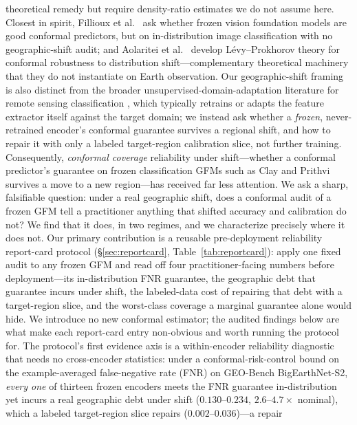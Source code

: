 \documentclass[journal]{IEEEtran}
\renewcommand{\_}{\textunderscore\allowbreak}
\begin{document}
theoretical remedy but require density-ratio estimates we do not assume here.
Closest in spirit, Fillioux et al.~\citep{fillioux2024fmconformal} ask whether frozen vision foundation models are good
conformal predictors, but on in-distribution image classification with no geographic-shift audit; and
Aolaritei et al.~\citep{aolaritei2025levyprokhorov} develop L\'evy--Prokhorov theory for conformal robustness to distribution
shift---complementary theoretical machinery that they do not instantiate on Earth observation.
Our geographic-shift framing is also distinct from the broader unsupervised-domain-adaptation literature for
remote sensing classification \citep{tuia2016domain,zhu2017deep}, which typically retrains or adapts the
feature extractor itself against the target domain; we instead ask whether a \emph{frozen}, never-retrained
encoder's conformal guarantee survives a regional shift, and how to repair it with only a labeled
target-region calibration slice, not further training.
Consequently, \emph{conformal coverage} reliability
under shift---whether a conformal predictor's guarantee \citep{vovk2005algorithmic,angelopoulos2023conformal} on frozen classification GFMs
such as Clay and Prithvi survives a move to a new
region---has received far less attention. We ask a sharp, falsifiable question: under a real geographic
shift, does a conformal audit of a frozen GFM tell a practitioner anything that shifted accuracy
and calibration do not? We find that it does, in two regimes, and we characterize precisely where it
does not. Our primary contribution is a reusable pre-deployment reliability report-card protocol
(\S\ref{sec:reportcard}, Table~\ref{tab:reportcard}): apply one fixed audit to any frozen GFM and read
off four practitioner-facing numbers before deployment---its in-distribution FNR guarantee, the
geographic debt that guarantee incurs under shift, the labeled-data cost of repairing that debt with a
target-region slice, and the worst-class coverage a marginal guarantee alone would hide. We introduce no
new conformal estimator; the audited findings below are what make each report-card entry non-obvious and
worth running the protocol for. The protocol's first evidence axis is a within-encoder reliability
diagnostic that needs no cross-encoder
statistics: under a conformal-risk-control \citep{angelopoulos2024crc} bound on the example-averaged
false-negative rate (FNR) on GEO-Bench BigEarthNet-S2, \emph{every one} of thirteen frozen encoders meets
the FNR guarantee in-distribution yet incurs a real geographic debt under shift ($0.130$--$0.234$,
$2.6$--$4.7\times$ nominal), which a labeled target-region slice repairs ($0.002$--$0.036$)---a repair
\end{document}
